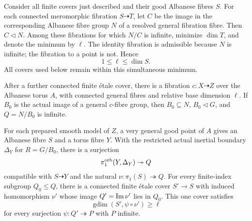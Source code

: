 Consider all finite covers just described and their good Albanese
fibres \(S\). For each connected meromorphic fibration
\(S\dashrightarrow T\), let \(C\) be the image in the corresponding
Albanese fibre group \(N\) of a resolved general fibration fibre.
Then \(C\triangleleft N\). Among these fibrations for which
\(N/C\) is infinite, minimize \(\dim T\), and denote the minimum
by \(\ell\). The identity fibration is admissible because \(N\)
is infinite; the fibration to a point is not. Hence
\[
 1\le\ell\le\dim S.
\]
All covers used below remain within this simultaneous minimum.

\begin{proposition}\label{prop:minimal-base}
After a further connected finite \'etale cover, there is a
fibration \(c:X\dashrightarrow Z\) over the Albanese torus
\(A\), with connected general fibres and relative base dimension
\(\ell\). If \(B_0\) is the actual image of a general
\(c\)-fibre group, then \(B_0\subseteq N\), \(B_0\triangleleft G\),
and \(Q=N/B_0\) is infinite.

For each prepared smooth model of \(Z\), a very general good point
of \(A\) gives an Albanese fibre \(S\) and a torus fibre \(Y\).
With the restricted actual inertial boundary \(\Delta_Y\) for
\(R=G/B_0\), there is a surjection
\[
 \pi_1^{\mathrm{orb}}(Y,\Delta_Y)\twoheadrightarrow Q
\]
compatible with \(S\dashrightarrow Y\) and the natural
\(\nu:\pi_1(S)\twoheadrightarrow Q\). For every finite-index
subgroup \(Q_0\le Q\), there is a connected finite \'etale cover
\(S'\to S\) with induced homomorphism \(\nu'\) whose image
\(Q'=\operatorname{Im}\nu'\) lies in \(Q_0\).
This one cover satisfies
\[
 \operatorname{gdim}(S',\psi\circ\nu')\ge\ell
\]
for every surjection \(\psi:Q'\twoheadrightarrow P\) with \(P\) infinite.
\end{proposition}
